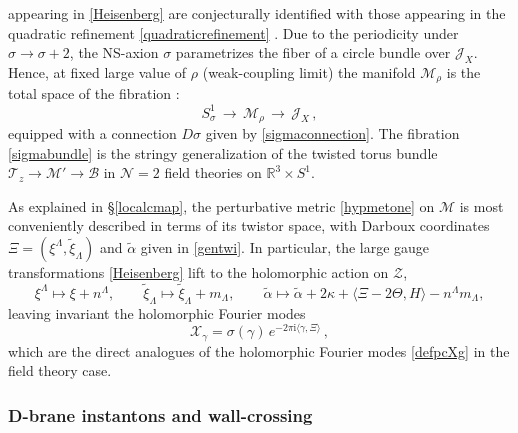\documentclass[12pt,reqno]{article}
\numberwithin{equation}{section}
\newcommand{\be}{\begin{equation}}
\newcommand{\ee}{\end{equation}}
\newcommand{\I}{\mathrm{i}}
\newcommand{\cB}{\mathcal{B}}
\newcommand{\cM}{\mathcal{M}}
\newcommand{\cN}{\mathcal{N}}
\newcommand{\cX}{\mathcal{X}}
\newcommand{\cT}{\mathcal{T}}
\newcommand{\cJ}{\mathcal{J}}
\newcommand{\cZ}{\mathcal{Z}}
\def\talp{\tilde\alpha}
\def\pcM{\cM'}
\numberwithin{equation}{section}
\begin{document}
appearing in \eqref{Heisenberg} are conjecturally
identified with those appearing in the quadratic refinement \eqref{quadraticrefinement}
\cite{Alexandrov:2010np}.
Due to the periodicity under $\sigma \rightarrow \sigma +2$, the NS-axion $\sigma$
parametrizes the fiber of a
circle bundle over $\cJ_X$. Hence, at fixed large value of $\rho$ (weak-coupling limit)
the manifold $\cM_\rho$ is the total space of the fibration \cite{Alexandrov:2010np,Alexandrov:2010ca}:
\be
S^{1}_\sigma\,   \longrightarrow\,   \cM_\rho  \, \longrightarrow\, \cJ_X\, ,
\label{sigmabundle}
\ee
equipped with a connection $D\sigma$ given by \eqref{sigmaconnection}.
The fibration \eqref{sigmabundle} is the stringy generalization of the twisted
torus bundle $\cT_z \rightarrow \pcM\rightarrow \cB$ in $\cN=2$ field theories
on $\mathbb{R}^3\times S^1$.


As explained in \S\ref{localcmap}, the perturbative metric \eqref{hypmetone}
on $\cM$ is most conveniently described in terms of its
twistor space,
with Darboux coordinates $\Xi=(\xi^{\Lambda}, \tilde\xi_\Lambda)$ and  $\talp$ given
in \eqref{gentwi}. In particular, the large gauge transformations
\eqref{Heisenberg} lift to the holomorphic action on $\cZ$,
\be
\label{heisalgz}
\xi^\Lambda \mapsto \xi+n^{\Lambda},
\qquad
\tilde\xi_\Lambda\mapsto \tilde\xi_\Lambda+m_\Lambda,
\qquad
\talp\mapsto\talp +2\kappa+ \langle \Xi-2\Theta,H\rangle - n^\Lambda m_\Lambda  ,
\ee
leaving invariant the holomorphic Fourier modes
\be
\cX_\gamma=\sigma(\gamma)\, e^{-2\pi\I\langle\gamma,\Xi\rangle}\, ,
\ee
which are the direct analogues of the holomorphic Fourier modes \eqref{defpcXg} in the
field theory case.






\subsubsection{D-brane instantons and wall-crossing}
\end{document}

